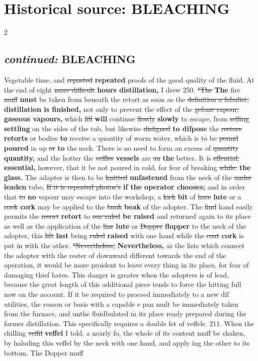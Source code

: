 \documentclass[10pt]{article}
\begin{document}
\section*{Historical source: BLEACHING}
\begin{multicols}{2}
\subsection*{\textit{continued:} BLEACHING}
Vegetable time, and \sout{repasted} \textbf{repeated} proofs of the good quality of the fluid. At the end of eight \sout{more difficult} \textbf{hours distillation,} I drew 250. \sout{"The} \textbf{The} fire \sout{muff} \textbf{must} be taken from beneath the retort as soon as the \sout{definition a fabulist,} \textbf{distillation is finished,} not only to prevent the effect of the \sout{gefone vapour,} \textbf{gaseous vapours,} which \sout{fill} \textbf{will} continue \sout{flowly} \textbf{slowly} to escape, from \sout{selling} \textbf{settling} on the sides of the tub, but likewise \sout{disfigned} \textbf{to difpose} the \sout{restore} \textbf{retorts} or bodies \textbf{to} receive a quantity of warm water, which is to be \sout{pound} \textbf{poured} in up \sout{or} \textbf{to} the neck. There is no need to form an excess of \sout{quantity} \textbf{quantity,} and the hotter the \sout{veffles} \textbf{vessels} are \sout{an} \textbf{the} better. It is \sout{effential,} \textbf{essential,} however, that it be not poured in cold, for fear of breaking \sout{while.} \textbf{the glass.} The adapter is then to be \sout{knitted} \textbf{unfastened} from the neck of the \sout{under} \textbf{leaden} tube, \sout{If it is repeated photos’s} \textbf{if the operator chooses;} and in order that \sout{to} \textbf{no} vapour may escape into the workshop, a \sout{kick} \textbf{bit} of \sout{hate} \textbf{lute} or a \sout{cook} \textbf{cork} may be applied to the \sout{bank} \textbf{beak} of the adopter. The \sout{find} hand easily permits the \sout{resort} \textbf{retort} to \sout{our ruled} \textbf{be raised} and returned again to its place as well as the application of the \sout{lins} \textbf{lute} or \sout{Dopper} \textbf{flopper} to the neck of the adopter, this \sout{lift} \textbf{last} being \sout{ruled} \textbf{raised} with one hand while the \sout{coat} \textbf{cork} is put in with the other. \sout{"Nevertheless,} \textbf{Nevertheless,} as the lists which connect the adopter with the rester of downward different towards the end of the operation, it would be more proident to leave every thing in its place, for fear of damaging thief hates. This danger is greater when the adopters is of lead, because the great length of this additional piece tends to force the hitting full now on the account. If it be required to proceed immediately to a new dif utilities, the reason or basis with a capable e pan mult be immediately taken from the furnace, and unthe fluidbulated in its place ready prepared during the former distillation. This specifically requires a double fet of veffels. 211. When the chilling \sout{veffil} \textbf{veffel} I told, a nearly fo, the whole of its content muff be shaken, by haluding this veffel by the neck with one hand, and apply ing the other to its bottom. The Dopper muff 
\end{multicols}
\end{document}

